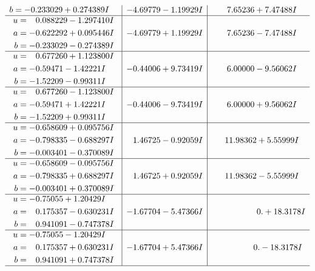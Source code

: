 \documentclass[1p]{elsarticle_modified}
\theoremstyle{definition}
\begin{document}
$$\begin{array}{c|c|c}
\begin{aligned}
b &= -0.233029 + 0.274389 I\end{aligned}
 & -4.69779 - 1.19929 I & \phantom{-}7.65236 + 7.47488 I \\ \hline\begin{aligned}
u &= \phantom{-}0.088229 - 1.297410 I \\
a &= -0.622292 + 0.095446 I \\
b &= -0.233029 - 0.274389 I\end{aligned}
 & -4.69779 + 1.19929 I & \phantom{-}7.65236 - 7.47488 I \\ \hline\begin{aligned}
u &= \phantom{-}0.677260 + 1.123800 I \\
a &= -0.59471 - 1.42221 I \\
b &= -1.52209 - 0.99311 I\end{aligned}
 & -0.44006 + 9.73419 I & \phantom{-}6.00000 - 9.56062 I \\ \hline\begin{aligned}
u &= \phantom{-}0.677260 - 1.123800 I \\
a &= -0.59471 + 1.42221 I \\
b &= -1.52209 + 0.99311 I\end{aligned}
 & -0.44006 - 9.73419 I & \phantom{-}6.00000 + 9.56062 I \\ \hline\begin{aligned}
u &= -0.658609 + 0.095756 I \\
a &= -0.798335 - 0.688297 I \\
b &= -0.003401 - 0.370089 I\end{aligned}
 & \phantom{-}1.46725 - 0.92059 I & \phantom{-}11.98362 + 5.55999 I \\ \hline\begin{aligned}
u &= -0.658609 - 0.095756 I \\
a &= -0.798335 + 0.688297 I \\
b &= -0.003401 + 0.370089 I\end{aligned}
 & \phantom{-}1.46725 + 0.92059 I & \phantom{-}11.98362 - 5.55999 I \\ \hline\begin{aligned}
u &= -0.75055 + 1.20429 I \\
a &= \phantom{-}0.175357 - 0.630231 I \\
b &= \phantom{-}0.941091 - 0.747378 I\end{aligned}
 & -1.67704 - 5.47366 I & \phantom{-0.000000 -}0. + 18.3178 I \\ \hline\begin{aligned}
u &= -0.75055 - 1.20429 I \\
a &= \phantom{-}0.175357 + 0.630231 I \\
b &= \phantom{-}0.941091 + 0.747378 I\end{aligned}
 & -1.67704 + 5.47366 I & \phantom{-0.000000 } 0. - 18.3178 I\\
 \hline 
 \end{array}$$\newpage
\end{document}
